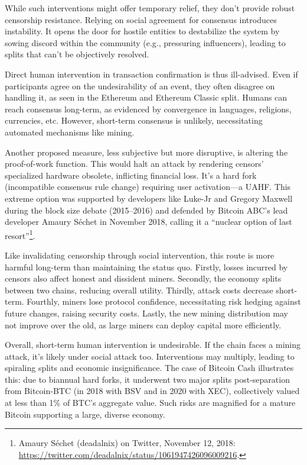 \documentclass[
  a5paper,
  smalldemyvopaper,10pt,twoside,onecolumn,openright,extrafontsizes,hidelinks]{memoir}
\begin{document}
While such interventions might offer temporary relief, they don't
provide robust censorship resistance. Relying on social agreement for
consensus introduces instability. It opens the door for hostile entities
to destabilize the system by sowing discord within the community (e.g.,
pressuring influencers), leading to splits that can't be objectively
resolved.

Direct human intervention in transaction confirmation is thus
ill-advised. Even if participants agree on the undesirability of an
event, they often disagree on handling it, as seen in the Ethereum and
Ethereum Classic split. Humans can reach consensus long-term, as
evidenced by convergence in languages, religions, currencies, etc.
However, short-term consensus is unlikely, necessitating automated
mechanisms like mining.

Another proposed measure, less subjective but more disruptive, is
altering the proof-of-work function. This would halt an attack by
rendering censors' specialized hardware obsolete, inflicting financial
loss. It's a hard fork (incompatible consensus rule change) requiring
user activation---a UAHF. This extreme option was supported by
developers like Luke-Jr and Gregory Maxwell during the block size debate
(2015--2016) and defended by Bitcoin ABC's lead developer Amaury Séchet
in November 2018, calling it a ``nuclear option of last
resort''\footnote{Amaury Séchet (deadalnix) on Twitter, November 12,
  2018: \url{https://twitter.com/deadalnix/status/1061947426096009216}.}.

Like invalidating censorship through social intervention, this route is
more harmful long-term than maintaining the status quo. Firstly, losses
incurred by censors also affect honest and dissident miners. Secondly,
the economy splits between two chains, reducing overall utility.
Thirdly, attack costs decrease short-term. Fourthly, miners lose
protocol confidence, necessitating risk hedging against future changes,
raising security costs. Lastly, the new mining distribution may not
improve over the old, as large miners can deploy capital more
efficiently.

Overall, short-term human intervention is undesirable. If the chain
faces a mining attack, it's likely under social attack too.
Interventions may multiply, leading to spiraling splits and economic
insignificance. The case of Bitcoin Cash illustrates this: due to
biannual hard forks, it underwent two major splits post-separation from
Bitcoin-BTC (in 2018 with BSV and in 2020 with XEC), collectively valued
at less than 1\% of BTC's aggregate value. Such risks are magnified for
a mature Bitcoin supporting a large, diverse economy.
\end{document}
